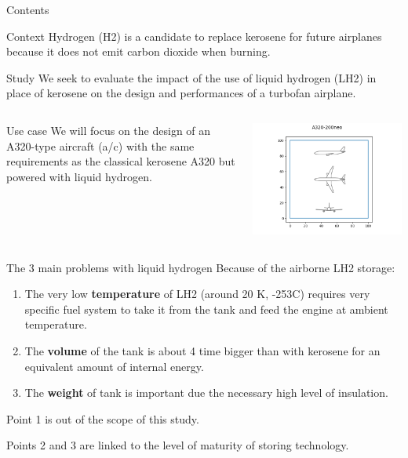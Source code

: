 \documentclass[aspectratio=169]{beamer}
\begin{document}
\begin{frame}{Contents}
    \tableofcontents[currentsection]
\end{frame}

\begin{frame}{Context}
    Hydrogen (H2) is a candidate to replace kerosene for future airplanes because it does not emit carbon dioxide when burning.
    \begin{block}{Study}
    We seek to evaluate the impact of the use of liquid hydrogen (LH2) in place of kerosene on the design and performances of a turbofan airplane.
    \end{block}
    \begin{columns}
    \begin{column}{0.6\textwidth}
    \begin{exampleblock}{Use case}
    We will focus on the design of an A320-type aircraft (a/c)
    with the same requirements as the classical kerosene A320
    but powered with liquid hydrogen.
    \end{exampleblock}
    \end{column}
    \begin{column}{0.4\textwidth}
        \includegraphics[width=\linewidth]{lh2pac_2}
    \end{column}
    \end{columns}
\end{frame}
\begin{frame}{The 3 main problems with liquid hydrogen}
    Because of the airborne LH2 storage:
    \begin{enumerate}
        \item The very low \textbf{temperature} of LH2 (around 20 K, -253\textdegree C) requires very specific fuel system to take it from the tank and feed the engine at ambient temperature.
        \item The \textbf{volume} of the tank is about 4 time bigger than with kerosene for an equivalent amount of internal energy.
        \item The \textbf{weight} of tank is important due the necessary high level of insulation.
    \end{enumerate}
    Point 1 is out of the scope of this study.

    Points 2 and 3 are linked to the level of maturity of storing technology.
\end{frame}
\end{document}
